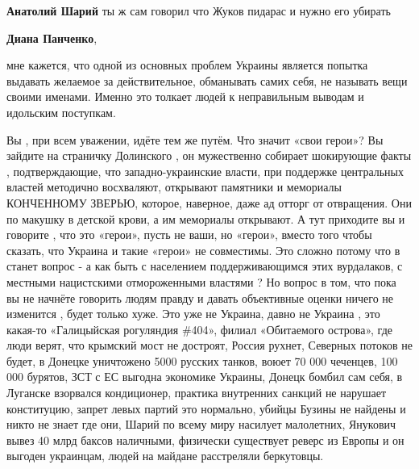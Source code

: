 \begin{itemize}
\begin{itemize}
\textbf{Анатолий Шарий} ты ж сам говорил что Жуков пидарас и нужно его убирать

 
\textbf{Диана Панченко}, 

мне кажется, что одной из основных проблем Украины является попытка выдавать
желаемое за действительное, обманывать самих себя, не называть вещи своими
именами. Именно это толкает людей к неправильным выводам и идольским поступкам.

Вы , при всем уважении, идёте тем же путём. Что значит «свои герои»? Вы зайдите
на страничку Долинского , он мужественно собирает шокирующие факты ,
подтверждающие, что западно-украинские власти, при поддержке центральных
властей методично восхваляют, открывают памятники и мемориалы КОНЧЕННОМУ
ЗВЕРЬЮ, которое, наверное, даже ад отторг от отвращения. Они по макушку в
детской крови, а им мемориалы открывают. А тут приходите вы и говорите , что
это «герои», пусть не ваши, но «герои», вместо того чтобы сказать, что Украина
и такие «герои» не совместимы. Это сложно потому что в станет вопрос - а как
быть с населением поддерживающимся этих вурдалаков, с местными нацистскими
отмороженными властями ? Но вопрос в том, что пока вы не начнёте говорить людям
правду и давать объективные оценки ничего не изменится , будет только хуже. Это
уже не Украина, давно не Украина , это какая-то «Галицыйская рогуляндия \#404»,
филиал «Обитаемого острова», где люди верят, что крымский мост не достроят,
Россия рухнет, Северных потоков не будет, в Донецке уничтожено 5000 русских
танков, воюет 70 000 чеченцев, 100 000 бурятов, ЗСТ с ЕС выгодна экономике
Украины, Донецк бомбил сам себя, в Луганске взорвался кондиционер, практика
внутренних санкций не нарушает конституцию, запрет левых партий это нормально,
убийцы Бузины не найдены и никто не знает где они, Шарий по всему миру насилует
малолетних, Янукович вывез 40 млрд баксов наличными, физически существует
реверс из Европы и он выгоден украинцам, людей на майдане расстреляли
беркутовцы.


 


\end{itemize}
\end{itemize}
